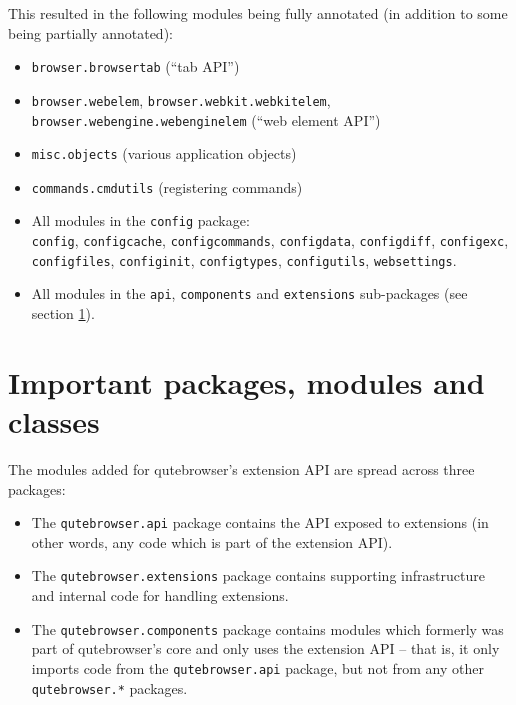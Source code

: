 This resulted in the following modules being fully annotated (in addition to
some being partially annotated):

\begin{itemize}[parsep=5pt]
  \item \texttt{browser.browsertab} (``tab API'')
  \item \texttt{browser.webelem}, \texttt{browser.webkit.webkitelem}, \\
    \texttt{browser.webengine.webenginelem} (``web element API'')
  \item \texttt{misc.objects} (various application objects)
  \item \texttt{commands.cmdutils} (registering commands)
  \item All modules in the \texttt{config} package: \\ \texttt{config}, \texttt{configcache},
    \texttt{configcommands}, \texttt{configdata}, \texttt{configdiff},
    \texttt{configexc}, \\ \texttt{configfiles}, \texttt{configinit}, \texttt{configtypes},
    \texttt{configutils}, \texttt{websettings}.
  \item All modules in the \texttt{api}, \texttt{components}
    and \texttt{extensions} sub-packages (see section \ref{sec:important}).
\end{itemize}


\section{Important packages, modules and classes}
\label{sec:important}
The modules added for qutebrowser's extension API are spread across three
packages:

\begin{itemize}
\item The \verb|qutebrowser.api| package contains the API exposed to
  extensions (in other words, any code which is part of the extension API).
\item The \verb|qutebrowser.extensions| package contains supporting infrastructure and
  internal code for handling extensions.
\item The \verb|qutebrowser.components| package contains modules which formerly
was part of qutebrowser's core and only uses the extension API -- that is, it
only imports code from the \verb|qutebrowser.api| package, but not from any
other \verb|qutebrowser.*| packages.
\end{itemize}


